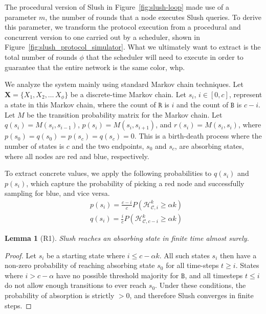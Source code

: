 \documentclass[letterpaper,twocolumn,10pt]{article}
\newcommand{\tronly}[2]{#1}
\newtheorem{lemma}[theorem]{Lemma}
\theoremstyle{definition}
\begin{document}
\begin{appendices}
\tronly{
The procedural version of Slush in Figure~\ref{fig:slush-loop} made use of a parameter $m$, the number of rounds that a node executes Slush queries. To derive this parameter, we transform the protocol execution from a procedural and concurrent version to one carried out by a scheduler, shown in Figure~\ref{fig:slush_protocol_simulator}.
What we ultimately want to extract is the total number of rounds $\phi$ that the scheduler will need to execute in order to guarantee that the entire network is the same color, whp.
}{}

We analyze the system mainly using standard Markov chain techniques. Let $\mathbf{X} = \{\mathit{X_1}, \mathit{X_2}, \dots\, \mathit{X}_\phi\}$ be a discrete-time Markov chain.
Let $s_i$, $i \in [0, c]$, represent a state in this Markov chain, where the count of $\mathtt{R}$ is $i$ and the count of $\mathtt{B}$ is $c - i$.
Let $\mathit{M}$ be the transition probability matrix for the Markov chain.
Let $q(s_i) = \mathit{M}(s_i, s_{i-1})$, $p(s_i) = \mathit{M}(s_i, s_{i+1})$, and $r(s_i) = \mathit{M}(s_i, s_{i})$, where $p(s_0) = q(s_0) = p(s_c) = q(s_c) = 0$.
This is a birth-death process where the number of states is $c$ and the two endpoints, $s_0$ and $s_c$, are absorbing states, where all nodes are red and blue, respectively.

To extract concrete values, we apply the following probabilities to $q(s_i)$ and $p(s_i)$, which capture the probability of picking a red node and successfully sampling for blue, and vice versa.
\begin{equation*}
\begin{split}
&p(s_i) = \frac{c-i}{c}P(\mathcal{H}_{\mathcal{C}, i}^{k} \geq \alpha k)\\
&q(s_i) = \frac{i}{c}P(\mathcal{H}_{\mathcal{C}, c-i}^{k} \geq \alpha k)
\end{split}
\end{equation*}

\begin{lemma}[R1]
Slush reaches an absorbing state in finite time almost surely.
\end{lemma}
\begin{proof}
Let $s_i$ be a starting state where $i \leq c - \alpha k$. All such states $s_i$ then have a non-zero probability of reaching absorbing state $s_0$ for all time-steps $t \geq i$. States where $i > c - \alpha$ have no possible threshold majority for $\mathtt{B}$, and all timesteps $t \leq i$ do not allow enough transitions to ever reach $s_0$. 
Under these conditions, the probability of absorption is strictly $> 0$, and therefore Slush converges in finite steps. 
\end{proof}


\end{appendices}
\end{document}
